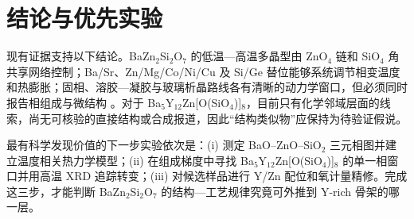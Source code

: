 \section{结论与优先实验}

现有证据支持以下结论。BaZn$_2$Si$_2$O$_7$ 的低温—高温多晶型由 ZnO$_4$ 链和 SiO$_4$ 角共享网络控制；Ba/Sr、Zn/Mg/Co/Ni/Cu 及 Si/Ge 替位能够系统调节相变温度和热膨胀；固相、溶胶—凝胶与玻璃析晶路线各有清晰的动力学窗口，但必须同时报告相组成与微结构 \cite{lin1999phase,kerstan2012thermal,thieme2015ba1,thieme2016new,bocker2012in}。对于 Ba$_5$Y$_{12}$Zn[O(SiO$_4$)]$_8$，目前只有化学邻域层面的线索，尚无可核验的直接结构或合成报道，因此“结构类似物”应保持为待验证假说。

最有科学发现价值的下一步实验依次是：(i) 测定 BaO--ZnO--SiO$_2$ 三元相图并建立温度相关热力学模型；(ii) 在组成梯度中寻找 Ba$_5$Y$_{12}$Zn[O(SiO$_4$)]$_8$ 的单一相窗口并用高温 XRD 追踪转变；(iii) 对候选样品进行 Y/Zn 配位和氧计量精修。完成这三步，才能判断 BaZn$_2$Si$_2$O$_7$ 的结构—工艺规律究竟可外推到 Y-rich 骨架的哪一层。
